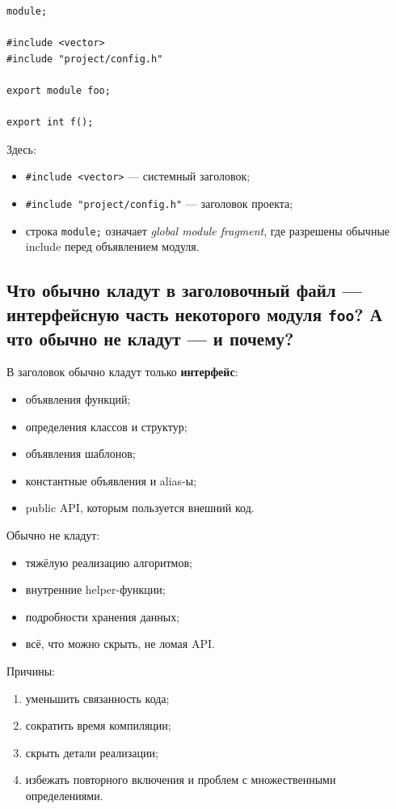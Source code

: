 \begin{example}
\begin{verbatim}
module;

#include <vector>
#include "project/config.h"

export module foo;

export int f();
\end{verbatim}
\end{example}

Здесь:
\begin{itemize}
    \item \texttt{\#include <vector>} — системный заголовок;
    \item \texttt{\#include "project/config.h"} — заголовок проекта;
    \item строка \texttt{module;} означает \textit{global module fragment}, где разрешены обычные include перед объявлением модуля.
\end{itemize}

\subsection{Что обычно кладут в заголовочный файл — интерфейсную часть некоторого модуля \texttt{foo}? А что обычно не кладут — и почему?}
В заголовок обычно кладут только \textbf{интерфейс}:
\begin{itemize}
    \item объявления функций;
    \item определения классов и структур;
    \item объявления шаблонов;
    \item константные объявления и alias-ы;
    \item public API, которым пользуется внешний код.
\end{itemize}

Обычно не кладут:
\begin{itemize}
    \item тяжёлую реализацию алгоритмов;
    \item внутренние helper-функции;
    \item подробности хранения данных;
    \item всё, что можно скрыть, не ломая API.
\end{itemize}

Причины:
\begin{enumerate}
    \item уменьшить связанность кода;
    \item сократить время компиляции;
    \item скрыть детали реализации;
    \item избежать повторного включения и проблем с множественными определениями.
\end{enumerate}

